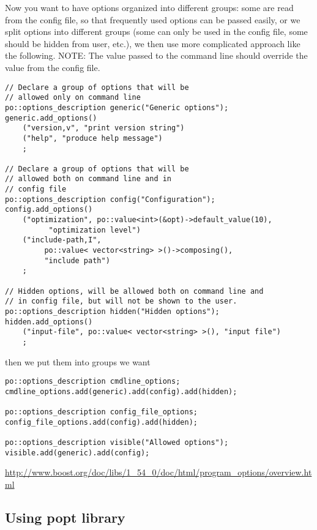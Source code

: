 Now you want to have options organized into different groups: some are read from
the config file, so that frequently used options can be passed easily, or we
split options into different groups (some can only be used  in the config file,
some should be hidden from user, etc.), we then use more complicated approach
like the following. NOTE: 
The value passed to the command line should override the value from the config file.
\begin{verbatim}
// Declare a group of options that will be 
// allowed only on command line
po::options_description generic("Generic options");
generic.add_options()
    ("version,v", "print version string")
    ("help", "produce help message")    
    ;
    
// Declare a group of options that will be 
// allowed both on command line and in
// config file
po::options_description config("Configuration");
config.add_options()
    ("optimization", po::value<int>(&opt)->default_value(10), 
          "optimization level")
    ("include-path,I", 
         po::value< vector<string> >()->composing(), 
         "include path")
    ;

// Hidden options, will be allowed both on command line and
// in config file, but will not be shown to the user.
po::options_description hidden("Hidden options");
hidden.add_options()
    ("input-file", po::value< vector<string> >(), "input file")
    ;     
\end{verbatim}

then we put them into groups we want
\begin{verbatim}
po::options_description cmdline_options;
cmdline_options.add(generic).add(config).add(hidden);

po::options_description config_file_options;
config_file_options.add(config).add(hidden);

po::options_description visible("Allowed options");
visible.add(generic).add(config);
\end{verbatim}


\url{http://www.boost.org/doc/libs/1_54_0/doc/html/program_options/overview.html}


\subsection{Using popt library}
\label{sec:popt_lib}

